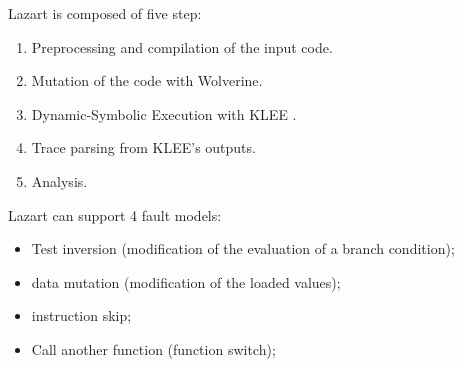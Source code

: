 Lazart is composed of five step:
\begin{enumerate}[noitemsep,leftmargin=0em,wide]
\item Preprocessing and compilation of the input code.
\item Mutation of the code with Wolverine.
\item Dynamic-Symbolic Execution with KLEE \cite{24Cadar2008KLEEUA,25kleeseKLEE}.
\item Trace parsing from KLEE's outputs.
\item Analysis.
\end{enumerate}

Lazart can support 4 fault models:
\begin{itemize}[noitemsep,leftmargin=0em,wide]
    \item Test inversion (modification of the evaluation of a branch condition);
    \item data mutation (modification of the loaded values);
    \item instruction skip;
    \item Call another function (function switch);
\end{itemize}
